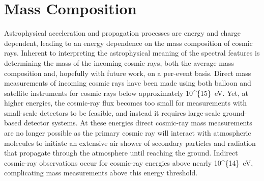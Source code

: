 



\section{Mass Composition}\label{sec:mass}
Astrophysical acceleration and propagation processes are energy and charge dependent, leading to an energy dependence on the mass composition of cosmic rays.
Inherent to interpreting the astrophysical meaning of the spectral features is determining the mass of the incoming cosmic rays, both the average mass composition and, hopefully with future work, on a per-event basis.
Direct mass measurements of incoming cosmic rays have been made using both balloon and satellite instruments for cosmic rays below approximately \qty[parse-numbers=false]{10^{15}}{\electronvolt}.
Yet, at higher energies, the cosmic-ray flux becomes too small for measurements with small-scale detectors to be feasible, and instead it requires large-scale ground-based detector systems.
At these energies direct cosmic-ray mass measurements are no longer possible as the primary cosmic ray will interact with atmospheric molecules to initiate an extensive air shower of secondary particles and radiation that propagate through the atmosphere until reaching the ground.
Indirect cosmic-ray observations occur for cosmic-ray energies above nearly \qty[parse-numbers=false]{10^{14}}{\electronvolt}, complicating mass measurements above this energy threshold.

